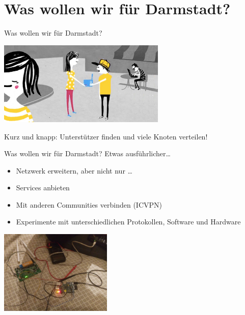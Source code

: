\documentclass{beamer}
\begin{document}
\section{Was wollen wir für Darmstadt?}
\begin{frame}{Was wollen wir für Darmstadt?}
\begin{center}
\vfill
\includegraphics[width=0.6\textwidth]{images/router}
\end{center}

\vfill
Kurz und knapp: Unterstützer finden und viele Knoten verteilen!
\vfill
\end{frame}


\begin{frame}{Was wollen wir für Darmstadt?}
\vfill
Etwas ausführlicher\ldots
\begin{itemize}
\pause\item Netzwerk erweitern\pause, aber nicht nur \ldots
\pause\item Services anbieten
\pause\item Mit anderen Communities verbinden (ICVPN)
\pause\item Experimente mit unterschiedlichen Protokollen, Software und Hardware
\end{itemize}
\begin{center}
\vfill
\includegraphics[width=0.4\textwidth]{images/disassemble}
\end{center}
\vfill
\end{frame}
\end{document}
